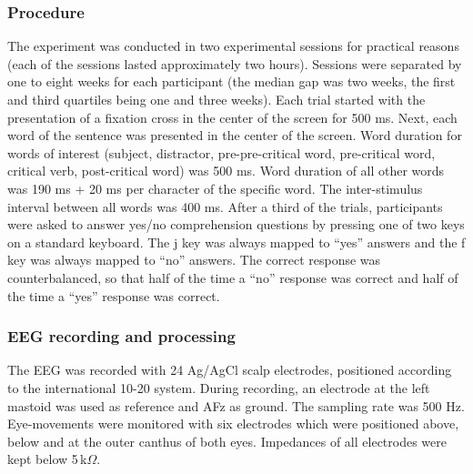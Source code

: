 \documentclass[a4paper, man, floatsintext]{apa7}
\begin{document}
\subsubsection{Procedure}
The experiment was conducted in two experimental sessions for practical reasons (each of the sessions lasted approximately two hours). Sessions were separated by one to eight weeks for each participant (the median gap was two weeks, the first and third quartiles being one and three weeks). \label{fillers2} Each trial started with the presentation of a fixation cross in the center of the screen for 500 ms. Next, each word of the sentence was presented in the center of the screen. Word duration for words of interest (subject, distractor, pre-pre-critical word, pre-critical word, critical verb, post-critical word) was 500 ms. Word duration of all other words was 190 ms + 20 ms per character of the specific word. The inter-stimulus interval between all words was 400 ms. After a third of the trials, participants were asked to answer yes/no comprehension questions by pressing one of two keys on a standard keyboard. The j key was always mapped to ``yes'' answers and the f key was always mapped to ``no'' answers. The correct response was counterbalanced, so that half of the time a ``no'' response was correct and half of the time a ``yes'' response was correct.

\subsubsection{EEG recording and processing}
The EEG was recorded with 24 Ag/AgCl scalp electrodes, positioned according to the international 10-20 system. During recording, an electrode at the left mastoid was used as reference and AFz as ground. The sampling rate was 500 Hz. Eye-movements were monitored with six electrodes which were positioned above, below and at the outer canthus of both eyes. Impedances of all electrodes were kept below 5\,k$\Omega$.
\end{document}
